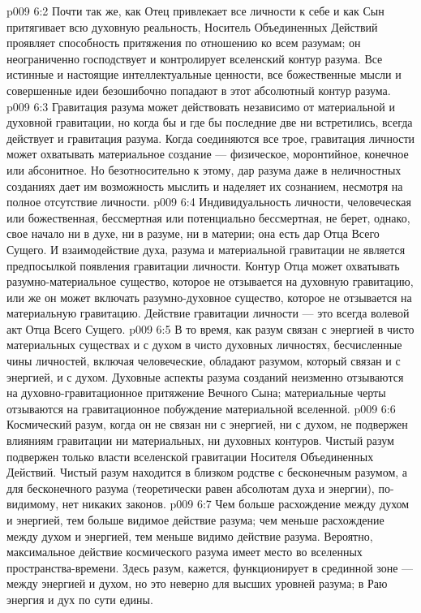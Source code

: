 \vs p009 6:2 Почти так же, как Отец привлекает все личности к себе и как Сын притягивает всю духовную реальность, Носитель Объединенных Действий проявляет способность притяжения по отношению ко всем разумам; он неограниченно господствует и контролирует вселенский контур разума. Все истинные и настоящие интеллектуальные ценности, все божественные мысли и совершенные идеи безошибочно попадают в этот абсолютный контур разума.
\vs p009 6:3 \pc Гравитация разума может действовать независимо от материальной и духовной гравитации, но когда бы и где бы последние две ни встретились, всегда действует и гравитация разума. Когда соединяются все трое, гравитация личности может охватывать материальное создание --- физическое, моронтийное, конечное или абсонитное. Но безотносительно к этому, дар разума даже в неличностных созданиях дает им возможность мыслить и наделяет их сознанием, несмотря на полное отсутствие личности.
\vs p009 6:4 \pc Индивидуальность личности, человеческая или божественная, бессмертная или потенциально бессмертная, не берет, однако, свое начало ни в духе, ни в разуме, ни в материи; она есть дар Отца Всего Сущего. И взаимодействие духа, разума и материальной гравитации не является предпосылкой появления гравитации личности. Контур Отца может охватывать разумно\hyp{}материальное существо, которое не отзывается на духовную гравитацию, или же он может включать разумно\hyp{}духовное существо, которое не отзывается на материальную гравитацию. Действие гравитации личности --- это всегда волевой акт Отца Всего Сущего.
\vs p009 6:5 В то время, как разум связан с энергией в чисто материальных существах и с духом в чисто духовных личностях, бесчисленные чины личностей, включая человеческие, обладают разумом, который связан и с энергией, и с духом. Духовные аспекты разума созданий неизменно отзываются на духовно\hyp{}гравитационное притяжение Вечного Сына; материальные черты отзываются на гравитационное побуждение материальной вселенной.
\vs p009 6:6 \pc Космический разум, когда он не связан ни с энергией, ни с духом, не подвержен влияниям гравитации ни материальных, ни духовных контуров. Чистый разум подвержен только власти вселенской гравитации Носителя Объединенных Действий. Чистый разум находится в близком родстве с бесконечным разумом, а для бесконечного разума (теоретически равен абсолютам духа и энергии), по\hyp{}видимому, нет никаких законов.
\vs p009 6:7 Чем больше расхождение между духом и энергией, тем больше видимое действие разума; чем меньше расхождение между духом и энергией, тем меньше видимо действие разума. Вероятно, максимальное действие космического разума имеет место во вселенных пространства\hyp{}времени. Здесь разум, кажется, функционирует в срединной зоне --- между энергией и духом, но это неверно для высших уровней разума; в Раю энергия и дух по сути едины.
